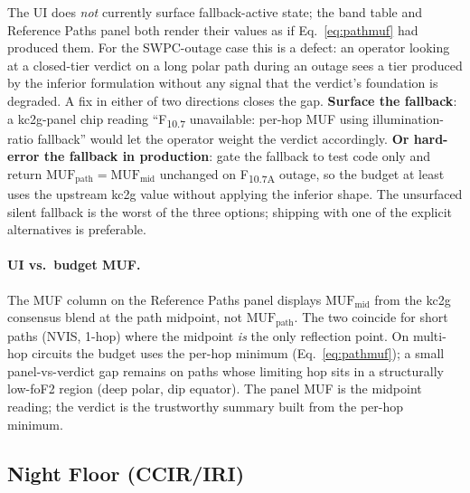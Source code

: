 \documentclass[11pt,a4paper]{article}
\begin{document}
The UI does \emph{not} currently surface fallback-active state;
the band table and Reference Paths panel both render their
values as if Eq.~\ref{eq:pathmuf} had produced them.  For the SWPC-outage
case this is a defect: an operator looking at a closed-tier
verdict on a long polar path during an outage sees a tier produced
by the inferior formulation without any signal that the verdict's
foundation is degraded.  A fix in either of two directions closes
the gap.  \textbf{Surface the fallback}: a kc2g-panel chip
reading ``F\textsubscript{10.7} unavailable: per-hop MUF using
illumination-ratio fallback'' would let the operator weight the
verdict accordingly.  \textbf{Or hard-error the fallback in
production}: gate the fallback to test code only and return
$\text{MUF}_{\text{path}} = \text{MUF}_{\text{mid}}$ unchanged on
F\textsubscript{10.7A} outage, so the budget at least uses the
upstream kc2g value without applying the inferior shape.  The
unsurfaced silent fallback is the worst of the three options;
shipping with one of the explicit alternatives is preferable.

\paragraph{UI vs.\ budget MUF.}  The MUF column on the Reference
Paths panel displays $\text{MUF}_{\text{mid}}$ from the kc2g
consensus blend at the path midpoint, not
$\text{MUF}_{\text{path}}$.  The two coincide for short paths
(NVIS, 1-hop) where the midpoint \emph{is} the only reflection
point. On multi-hop circuits the budget uses the per-hop minimum
(Eq.~\ref{eq:pathmuf}); a small panel-vs-verdict gap remains on
paths whose limiting hop sits in a structurally low-foF2 region
(deep polar, dip equator). The panel MUF is the midpoint reading;
the verdict is the trustworthy summary built from the per-hop
minimum.

\subsection{Night Floor (CCIR/IRI)}\label{sec:nightfloor}
\end{document}
